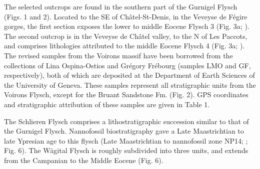 \documentclass[twoside]{article}
\begin{document}

The selected outcrops are found in the southern part of the Gurnigel  Flysch (Figs. 1 and 2). Located to the SE of Châtel-St-Denis, in the Veveyse de Fégire gorges, the first section exposes the lower to middle Eocene Flysch 3 (Fig. 3a; \citealp{Weidmann1976a}). The second outcrop is in the Veveyse de Châtel valley, to the N of Les Paccots, and comprises lithologies attributed to the middle Eocene Flysch 4 (Fig. 3a; \citealp{Morel1980b}). The revised samples from the Voirons massif have been borrowed from the collections of Lina Ospina-Ostios and Grégory Frébourg (samples LMO and GF, respectively), both of which are deposited at the Department of Earth Sciences of the University of Geneva. These samples represent all stratigraphic units from the Voirons Flysch, except for the Bruant Sandstone Fm. (Fig. 2). GPS coordinates and stratigraphic attribution of these samples are given in Table 1.\par
The Schlieren Flysch \citep{Winkler1983,Winkler1984} comprises a lithostratigraphic succession similar to that of the Gurnigel Flysch. Nannofossil biostratigraphy gave a Late Maastrichtian to late Ypresian age to this flysch (Late Maastrichtian to nannofossil zone NP14; \citealp{Winkler1984,Caron1989}; Fig. 6). The Wägital Flysch \citep{Winkler1985a} is roughly subdivided into three units, and extends from the Campanian to the Middle Eocene (Fig. 6).
\end{document}
